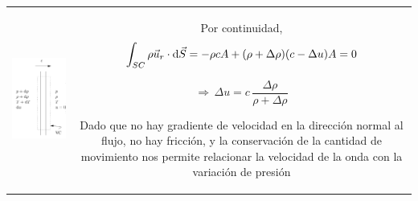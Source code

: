 	\begin{tabular}{cc}
		\begin{minipage}[c]{0.3\textwidth}%
			\begin{center}
				\includegraphics[width=\linewidth]{TeX_files/chapter11-Compresible/onda1}
			\end{center}
		
		\end{minipage} & %
		\begin{minipage}[c]{0.6\textwidth}%
			Por continuidad, 
			\[
			\int_{SC}\rho\vec{u}_{r}\cdot\text{d}\vec{S}=-\rho cA+(\rho+\Delta\rho)(c-\Delta u)A=0
			\]
			
			\[
			\Rightarrow\,\Delta u=c\,\frac{\Delta\rho}{\rho+\Delta\rho}
			\]
			
			Dado que no hay gradiente de velocidad en la dirección normal al flujo,
			no hay fricción, y la conservación de la cantidad de movimiento nos
			permite relacionar la velocidad de la onda con la variación de presión %
		\end{minipage}\tabularnewline
	\end{tabular}

